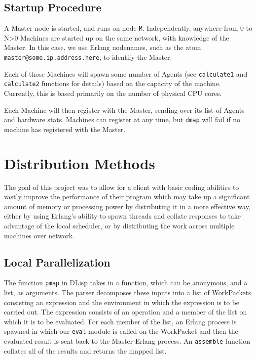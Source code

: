 \documentclass[letterpaper,twocolumn,10pt]{article}
\begin{document}
\subsection{Startup Procedure}

A Master node is started, and runs on node \verb|M|. Independently, anywhere
from 0 to N>0 Machines are started up on the same network, with knowledge of
the Master. In this case, we use Erlang nodenames, such as the atom
\verb|master@some.ip.address.here|, to identify the Master.

Each of those Machines will spawn some number of Agents (see \verb|calculate1|
and \verb|calculate2| functions for details) based on the capacity of the
machine. Currently, this is based primarily on the number of physical CPU
cores.

Each Machine will then register with the Master, sending over its list of
Agents and hardware stats. Machines can register at any time, but \verb|dmap|
will fail if no machine has registered with the Master.

\section{Distribution Methods}

The goal of this project was to allow for a client with basic coding abilities
to vastly improve the performance of their program which may take up a
significant amount of memory or processing power by distributing it in a more
effective way, either  by using Erlang's ability to spawn threads and collate
responses to take advantage of the local scheduler, or by distributing the work
across multiple machines over network.

\subsection{Local Parallelization}

The function \verb|pmap| in DLisp takes in a function, which can be anonymous,
and a list, as arguments. The parser decomposes these inputs into a list of
WorkPackets consisting an expression and the environment in which the
expression is to be carried out. The expression consists of an operation and a
member of the list on which it is to be evaluated. For each member of the list,
an Erlang process is spawned in which our \verb|eval| module is called on the
WorkPacket and then the evaluated result is sent back to the Master Erlang
process. An \verb|assemble| function collates all of the results and returns
the mapped list.
\end{document}
